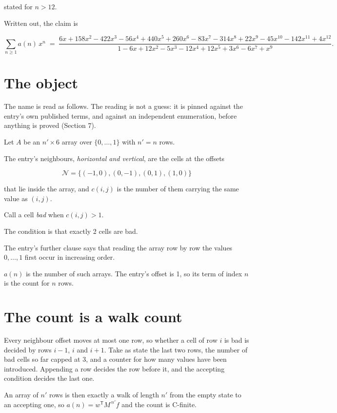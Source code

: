 \documentclass[11pt]{article}
\theoremstyle{definition}
\begin{document}
stated for $n > 12$.

Written out, the claim is

\[\sum_{n \ge 1} a(n)\,x^n \;=\; \frac{6x + 158x^{2} - 422x^{3} - 56x^{4} + 440x^{5} + 260x^{6} - 83x^{7} - 314x^{8} + 22x^{9} - 45x^{10} - 142x^{11} + 4x^{12}}{1 - 6x + 12x^{2} - 5x^{3} - 12x^{4} + 12x^{5} + 3x^{6} - 6x^{7} + x^{9}}.\]

\section{The object}

The name is read as follows. The reading is not a guess: it is pinned against the entry's own published terms, and against an independent enumeration, before anything is proved (Section 7).

Let $A$ be an $n' \times 6$ array over $\{0,\dots,1\}$ with $n' = n$ rows.

The entry's neighbours, {\itshape horizontal and vertical}, are the cells at the offsets

\[\mathcal{N} = \{(-1,0), (0,-1), (0,1), (1,0)\}\]

that lie inside the array, and $c(i,j)$ is the number of them carrying the same value as $(i,j)$.

Call a cell {\itshape bad} when $c(i,j) > 1$.

The condition is that exactly 2 cells are bad.

The entry's further clause says that reading the array row by row the values $0,\dots,1$ first occur in increasing order.

$a(n)$ is the number of such arrays. The entry's offset is 1, so its term of index $n$ is the count for $n$ rows.

\section{The count is a walk count}

Every neighbour offset moves at most one row, so whether a cell of row $i$ is bad is decided by rows $i-1$, $i$ and $i+1$. Take as state the last two rows, the number of bad cells so far capped at 3, and a counter for how many values have been introduced. Appending a row decides the row before it, and the accepting condition decides the last one.

An array of $n'$ rows is then exactly a walk of length $n'$ from the empty state to an accepting one, so $a(n) = w^{\mathsf T}M^{\,n'}f$ and the count is C-finite.
\end{document}
